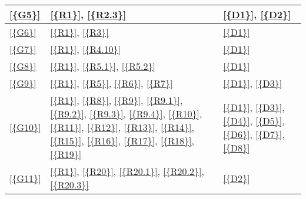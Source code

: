 \begin{table}[H]
\begin{tabular}{|l|p{8cm}|p{5cm}|}
            \ref{{G5}}       & \ref{{R1}}, \ref{{R2.3}}                                                                                                                                                                                                     & \ref{{D1}}, \ref{{D2}}                                                             \\\hline
            \ref{{G6}}       & \ref{{R1}}, \ref{{R3}}                                                                                                                                                                                                       & \ref{{D1}}                                                                         \\\hline
            \ref{{G7}}       & \ref{{R1}}, \ref{{R4.10}}                                                                                                                                                                                                    & \ref{{D1}}                                                                         \\\hline
            \ref{{G8}}       & \ref{{R1}}, \ref{{R5.1}}, \ref{{R5.2}}                                                                                                                                                                                       & \ref{{D1}}                                                                         \\\hline
            \ref{{G9}}       & \ref{{R1}}, \ref{{R5}}, \ref{{R6}}, \ref{{R7}}                                                                                                                                                                               & \ref{{D1}}, \ref{{D3}}                                                             \\\hline
            \ref{{G10}}      & \ref{{R1}}, \ref{{R8}}, \ref{{R9}}, \ref{{R9.1}}, \ref{{R9.2}}, \ref{{R9.3}}, \ref{{R9.4}}, \ref{{R10}}, \ref{{R11}}, \ref{{R12}}, \ref{{R13}}, \ref{{R14}}, \ref{{R15}}, \ref{{R16}}, \ref{{R17}}, \ref{{R18}}, \ref{{R19}} & \ref{{D1}}, \ref{{D3}}, \ref{{D4}}, \ref{{D5}}, \ref{{D6}}, \ref{{D7}}, \ref{{D8}} \\\hline
            \ref{{G11}}      & \ref{{R1}}, \ref{{R20}}, \ref{{R20.1}}, \ref{{R20.2}}, \ref{{R20.3}}                                                                                                                                                         & \ref{{D2}}                                                                         \\\hline

\end{tabular}
\end{table}
